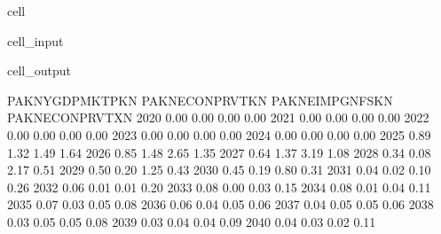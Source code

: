 \documentclass[letterpaper,10pt,english]{jupyterBook}
\begin{document}
\begin{sphinxuseclass}{cell}\begin{sphinxVerbatimInput}

\begin{sphinxuseclass}{cell_input}
\begin{sphinxVerbatim}[commandchars=\\\{\}]
\PYG{p}{[}\PYG{p}{]}
\end{sphinxVerbatim}

\end{sphinxuseclass}\end{sphinxVerbatimInput}
\begin{sphinxVerbatimOutput}

\begin{sphinxuseclass}{cell_output}
\begin{sphinxVerbatim}[commandchars=\\\{\}]
      PAKNYGDPMKTPKN  PAKNECONPRVTKN  PAKNEIMPGNFSKN  PAKNECONPRVTXN
2020            0.00            0.00            0.00            0.00
2021            0.00            0.00            0.00            0.00
2022            0.00            0.00            0.00            0.00
2023            0.00            0.00            0.00            0.00
2024            0.00            0.00            0.00            0.00
2025           \PYGZhy{}0.89           \PYGZhy{}1.32           \PYGZhy{}1.49            1.64
2026           \PYGZhy{}0.85           \PYGZhy{}1.48           \PYGZhy{}2.65            1.35
2027           \PYGZhy{}0.64           \PYGZhy{}1.37           \PYGZhy{}3.19            1.08
2028            0.34           \PYGZhy{}0.08           \PYGZhy{}2.17           \PYGZhy{}0.51
2029            0.50            0.20           \PYGZhy{}1.25           \PYGZhy{}0.43
2030            0.45            0.19           \PYGZhy{}0.80           \PYGZhy{}0.31
2031           \PYGZhy{}0.04            0.02           \PYGZhy{}0.10            0.26
2032           \PYGZhy{}0.06            0.01           \PYGZhy{}0.01            0.20
2033           \PYGZhy{}0.08            0.00            0.03            0.15
2034           \PYGZhy{}0.08            0.01            0.04            0.11
2035           \PYGZhy{}0.07            0.03            0.05            0.08
2036           \PYGZhy{}0.06            0.04            0.05            0.06
2037           \PYGZhy{}0.04            0.05            0.05            0.06
2038           \PYGZhy{}0.03            0.05            0.05            0.08
2039           \PYGZhy{}0.03            0.04            0.04            0.09
2040           \PYGZhy{}0.04            0.03            0.02            0.11
\end{sphinxVerbatim}

\end{sphinxuseclass}\end{sphinxVerbatimOutput}

\end{sphinxuseclass}
\end{document}
